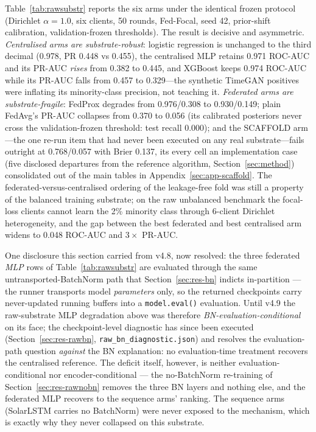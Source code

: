 Table~\ref{tab:rawsubstr} reports the six arms under the identical
frozen protocol (Dirichlet $\alpha{=}1.0$, six clients, 50 rounds,
Fed-Focal, seed 42, prior-shift calibration, validation-frozen
thresholds). The result is decisive and asymmetric.
\emph{Centralised arms are substrate-robust}: logistic regression is
unchanged to the third decimal (0.978, PR 0.448 vs 0.455), the
centralised MLP retains 0.971 ROC-AUC and its PR-AUC \emph{rises}
from 0.382 to 0.445, and XGBoost keeps 0.974 ROC-AUC while its
PR-AUC falls from 0.457 to 0.329---the synthetic TimeGAN positives
were inflating its minority-class precision, not teaching it.
\emph{Federated arms are substrate-fragile}: FedProx degrades from
0.976/0.308 to 0.930/0.149; plain FedAvg's PR-AUC collapses from
0.370 to 0.056 (its calibrated posteriors never cross the
validation-frozen threshold: test recall 0.000); and the
SCAFFOLD arm---the one re-run item that had never been executed on
any real substrate---fails outright at 0.768/0.057 with Brier
0.137, its every cell an implementation case (five disclosed
departures from the reference algorithm, Section~\ref{sec:method})
consolidated out of the main tables in
Appendix~\ref{sec:app-scaffold}. The
federated-versus-centralised ordering of the leakage-free fold was
still a property of the balanced training substrate; on the raw
unbalanced benchmark the focal-loss clients cannot learn the 2\%
minority class through 6-client Dirichlet heterogeneity, and the
gap between the best federated and best centralised arm widens to
0.048 ROC-AUC and $3\times$ PR-AUC.

One disclosure this section carried from v4.8, now resolved: the
three federated \emph{MLP} rows of Table~\ref{tab:rawsubstr} are
evaluated through the same untransported-BatchNorm path that
Section~\ref{sec:res-bn} indicts in-partition --- the runner
transports model \emph{parameters} only, so the returned
checkpoints carry never-updated running buffers into a
\texttt{model.eval()} evaluation. Until v4.9 the raw-substrate MLP
degradation above was therefore \emph{BN-evaluation-conditional} on
its face; the checkpoint-level diagnostic has since been executed
(Section~\ref{sec:res-rawbn}, \texttt{raw\_bn\_diagnostic.json}) and
resolves the evaluation-path question \emph{against} the BN
explanation: no evaluation-time treatment recovers the centralised
reference. The deficit itself, however, is neither
evaluation-conditional nor encoder-conditional --- the
no-BatchNorm re-training of Section~\ref{sec:res-rawnobn} removes the
three BN layers and nothing else, and the federated MLP recovers to
the sequence arms' ranking. The sequence arms (SolarLSTM carries no
BatchNorm) were never exposed to the mechanism, which is exactly why
they never collapsed on this substrate.

